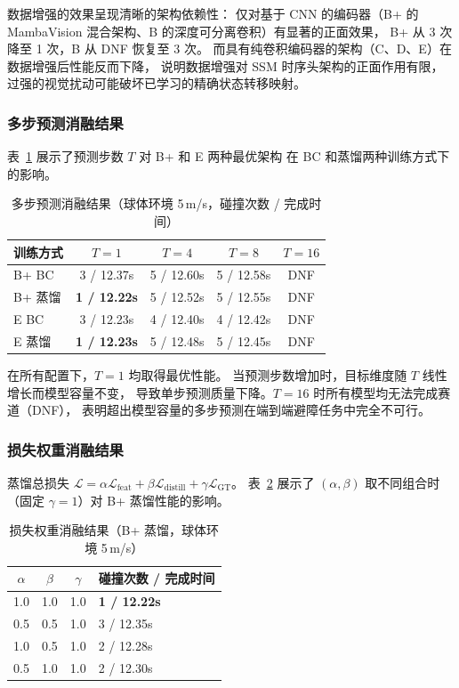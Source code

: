 \documentclass[12pt,a4paper]{article}
\numberwithin{equation}{section}
\numberwithin{figure}{section}
\numberwithin{table}{section}
\begin{document}
\noindent 数据增强的效果呈现清晰的架构依赖性：
仅对基于 CNN 的编码器（B+ 的 MambaVision 混合架构、B 的深度可分离卷积）有显著的正面效果，
B+ 从 3 次降至 1 次，B 从 DNF 恢复至 3 次。
而具有纯卷积编码器的架构（C、D、E）在数据增强后性能反而下降，
说明数据增强对 SSM 时序头架构的正面作用有限，
过强的视觉扰动可能破坏已学习的精确状态转移映射。

\subsubsection{多步预测消融结果}

表~\ref{tab:app_multistep} 展示了预测步数 $T$ 对 B+ 和 E 两种最优架构
在 BC 和蒸馏两种训练方式下的影响。

\begin{table}[H]
\centering
\caption{多步预测消融结果（球体环境 5\,m/s，碰撞次数 / 完成时间）}
\label{tab:app_multistep}
\begin{tabular}{lcccc}
\toprule
\textbf{训练方式} & $T=1$ & $T=4$ & $T=8$ & $T=16$ \\
\midrule
B+ BC & 3 / 12.37s & 5 / 12.60s & 5 / 12.58s & DNF \\
B+ 蒸馏 & \textbf{1 / 12.22s} & 5 / 12.52s & 5 / 12.55s & DNF \\
E BC & 3 / 12.23s & 4 / 12.40s & 4 / 12.42s & DNF \\
E 蒸馏 & \textbf{1 / 12.23s} & 5 / 12.48s & 5 / 12.45s & DNF \\
\bottomrule
\end{tabular}
\end{table}

\noindent 在所有配置下，$T=1$ 均取得最优性能。
当预测步数增加时，目标维度随 $T$ 线性增长而模型容量不变，
导致单步预测质量下降。$T=16$ 时所有模型均无法完成赛道（DNF），
表明超出模型容量的多步预测在端到端避障任务中完全不可行。

\subsubsection{损失权重消融结果}

蒸馏总损失 $\mathcal{L} = \alpha\mathcal{L}_{\text{feat}} + \beta\mathcal{L}_{\text{distill}} + \gamma\mathcal{L}_{\text{GT}}$。
表~\ref{tab:app_loss} 展示了 $(\alpha, \beta)$ 取不同组合时
（固定 $\gamma=1$）对 B+ 蒸馏性能的影响。

\begin{table}[H]
\centering
\caption{损失权重消融结果（B+ 蒸馏，球体环境 5\,m/s）}
\label{tab:app_loss}
\begin{tabular}{cccl}
\toprule
$\alpha$ & $\beta$ & $\gamma$ & 碰撞次数 / 完成时间 \\
\midrule
1.0 & 1.0 & 1.0 & \textbf{1 / 12.22s} \\
0.5 & 0.5 & 1.0 & 3 / 12.35s \\
1.0 & 0.5 & 1.0 & 2 / 12.28s \\
0.5 & 1.0 & 1.0 & 2 / 12.30s \\
\bottomrule
\end{tabular}
\end{table}
\end{document}
